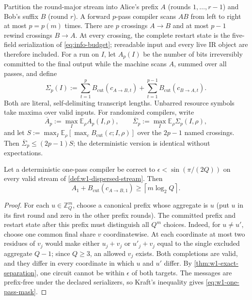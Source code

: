 \begin{definition}
\label{def:w1-pass-accounting}
Partition the round-major stream into Alice's prefix $A$ (rounds
$1,\ldots,r-1$) and Bob's suffix $B$ (round $r$).  A forward $p$-pass
compiler scans $AB$ from left to right at most $p=p(m)$ times.  There are
$p$ crossings $A\to B$ and at most $p-1$ rewind crossings $B\to A$.
At every crossing, the complete restart state is the five-field
serialization of \eqref{eq:info-budget}; rereadable input and every live
IR object are therefore included.  For a run on $I$, let $A_p(I)$ be the
number of bits
irreversibly committed to the final output while the machine scans $A$,
summed over all passes, and define
\begin{equation}
 \Sigma_p(I):=\sum_{t=1}^{p}B_{\mathrm{cut}}(c_{A\to B,t})
       +\sum_{t=1}^{p-1}B_{\mathrm{cut}}(c_{B\to A,t}).
 \label{eq:w1-transcript-budget}
\end{equation}
Both are literal, self-delimiting transcript lengths.  Unbarred resource
symbols take maxima over valid inputs.  For randomized compilers, write
\begin{equation*}
 \overline A_p:=\max_I\mathbb E_\rho A_p(I,\rho),\qquad
 \overline\Sigma_p:=\max_I\mathbb E_\rho\Sigma_p(I,\rho),
\end{equation*}
and let
$S:=\max_I\mathbb E_\rho[\max_cB_{\mathrm{cut}}(c;I,\rho)]$ over the
$2p-1$ named crossings.  Then
$\overline\Sigma_p\leq(2p-1)S$; the deterministic version is identical
without expectations.
\end{definition}

\begin{theorem}
\label{thm:w1-one-pass-mask}
Let a deterministic one-pass compiler be correct to
$\epsilon<\sin(\pi/(2Q))$ on every valid stream of
\cref{def:w1-dispersed-stream}.  Then
\begin{equation}
 A_1+B_{\mathrm{cut}}(c_{A\to B,1})
 \geq\left\lceil m\log_2Q\right\rceil.
 \label{eq:w1-one-pass-mask}
\end{equation}
\end{theorem}

\begin{proof}
For each $u\in\mathbb Z_Q^m$, choose a canonical prefix whose aggregate
is $u$ (put $u$ in its first round and zero in the other prefix rounds).
The committed prefix and restart state after this prefix must distinguish
all $Q^m$ choices.  Indeed, for $u\neq u'$, choose one common final share
$v$ coordinatewise.  At each coordinate at most two residues of $v_j$
would make either $u_j+v_j$ or $u'_j+v_j$ equal to the single excluded
aggregate $Q-1$; since $Q\geq3$, an allowed $v_j$ exists.  Both completions
are valid, and they differ in every coordinate in which $u$ and $u'$ differ.
By \cref{thm:w1-exact-separation}, one circuit cannot be within
$\epsilon$ of both targets.  The messages are prefix-free under the
declared serializers, so Kraft's inequality gives
\eqref{eq:w1-one-pass-mask}.
\end{proof}
